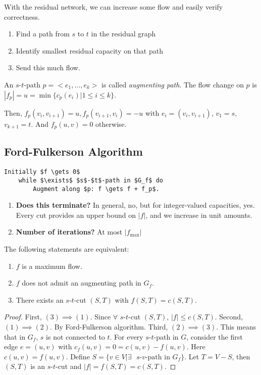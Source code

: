 With the residual network, we can increase some flow and easily verify correctness.

\begin{enumerate}
\item Find a path from $s$ to $t$ in the residual graph
\item Identify smallest residual capacity on that path
\item Send this much flow.
\end{enumerate}

\begin{mydefinition}
An $s$-$t$-path $p = <e_1, \ldots, e_k>$ is called \emph{augmenting path}. The flow change on $p$ is $|f_p| = u = \min\{c_p(e_i) | 1 \le i \le k\}$. 

Then, $f_p(v_i, v_{i+1}) = u, f_p(v_{i+1}, v_i) = -u$ with $e_i = (v_i, v_{i+1})$, $v_1 = s$, $v_{k+1} = t$. And $f_p(u,v) = 0$ otherwise.
\end{mydefinition}

\subsection{Ford-Fulkerson Algorithm}

\begin{lstlisting}[mathescape]
    Initially $f \gets 0$
    while $\exists$ $s$-$t$-path in $G_f$ do
        Augment along $p: f \gets f + f_p$.
\end{lstlisting}

\begin{enumerate}
\item \textbf{Does this terminate?}
    In general, no, but for integer-valued capacities, yes. Every cut provides an upper bound on $|f|$, and we increase in unit amounts.
 
\item \textbf{Number of iterations?}
    At most $|f_{\max}|$
\end{enumerate}

\begin{mytheorem}
The following statements are equivalent:
\begin{enumerate}
\item $f$ is a maximum flow.
\item $f$ does not admit an augmenting path in $G_f$.
\item There exists an $s$-$t$-cut $(S,T)$ with $f(S,T) = c(S,T)$. 
\end{enumerate}
\end{mytheorem}
\begin{proof}
First, $(3) \implies (1)$. Since $\forall$ $s$-$t$-cut $(S,T)$, $|f| \le c(S,T)$.
Second, $(1) \implies (2)$. By Ford-Fulkerson algorithm.
Third, $(2) \implies (3)$. This means that in $G_f$, $s$ is not connected to $t$. For every $s$-$t$-path in $G$, consider the first edge $e=(u,v)$ with $c_f(u,v) = 0 = c(u,v) - f(u,v)$. Here $c(u,v) = f(u,v)$. Define $S = \{ v \in V | \exists \text{ $s$-$v$-path in $G_f$}\}$. Let $T = V - S$, then $(S,T)$ is an $s$-$t$-cut and $|f| = f(S,T) = c(S,T)$.  
\end{proof}

